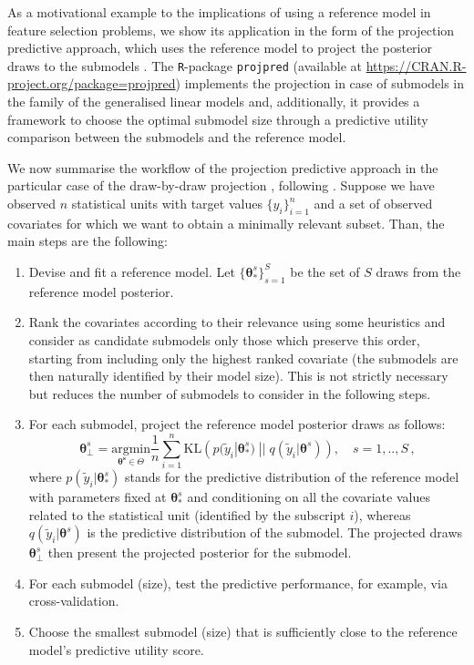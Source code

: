 \documentclass[american,]{article}
\theoremstyle{definition}
\begin{document}
As a motivational example to the implications of using a reference
model in feature selection problems, we show its application in the
form of the projection predictive approach, which uses the reference
model to project the posterior draws to the submodels
\citep{paper:original_proj}. The \texttt{R}-package \texttt{projpred}
(available at \url{https://CRAN.R-project.org/package=projpred})
implements the projection in case of submodels in the family of the
generalised linear models and, additionally, it provides a framework
to choose the optimal submodel size through a predictive utility
comparison between the submodels and the reference model.

We now summarise the workflow of the projection predictive approach in
the particular case of the draw-by-draw projection \cite[original
formulation by][]{paper:original_proj}, following
\cite{paper:projpred}. Suppose we have observed $n$ statistical units
with target values $\{y_{i}\}_{i=1}^{n}$ and a set of observed
covariates for which we want to obtain a minimally relevant
subset. Than, the main steps are the following:
\begin{enumerate}
\item Devise and fit a reference model. Let $\{\boldsymbol{\theta}_{*}^{s}\}_{s=1}^{S}$ be the set of $S$ draws from the reference model posterior.
\item Rank the covariates according to their relevance using some
  heuristics and consider as candidate submodels only those which
  preserve this order, starting from including only the highest ranked
  covariate (the submodels are then naturally identified by their
  model size). This is not strictly necessary but reduces the number
  of submodels to consider in the following steps.
\item For each submodel, project the reference model posterior draws as follows:
\begin{equation}\label{eq:draw_by_draw}
\boldsymbol{\theta}_{\perp}^{s} = \underset{\boldsymbol{\theta^{s}}\in\Theta}{\text{argmin}} \frac{1}{n}\sum_{i=1}^{n}\text{KL} \left( p(\tilde{y}_{i}|\boldsymbol{\theta}_{*}^{s})\;||\;q(\tilde{y}_{i}|\boldsymbol{\theta}^{s}) \right), \quad s=1,..,S \,,
\end{equation}
where $p(\tilde{y}_{i}|\boldsymbol{\theta}_{*}^{s})$ stands for the
predictive distribution of the reference model with parameters fixed
at $\boldsymbol{\theta}_{*}^{s}$ and conditioning on all the covariate
values related to the statistical unit (identified by the subscript
$i$), whereas $q(\tilde{y}_{i}|\boldsymbol{\theta}^{s})$ is the
predictive distribution of the submodel. The projected draws
$\boldsymbol{\theta}_{\perp}^{s}$ then present the projected posterior
for the submodel.
\item For each submodel (size), test the predictive performance, for example, via cross-validation.
\item Choose the smallest submodel (size) that is sufficiently close to the reference model's predictive utility score.
\end{enumerate} 
\end{document}
